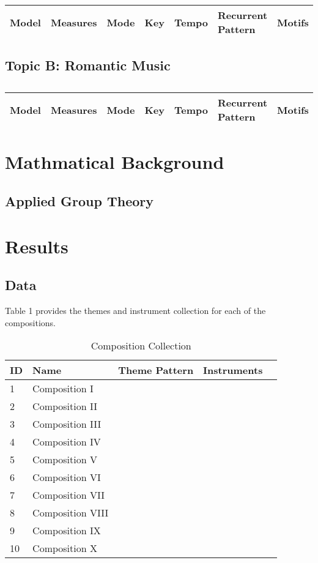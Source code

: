 \centering	
\begin{table}[H]\tiny
	\caption{}	
	\begin{tabular}{p{1cm}p{1cm}p{1cm}p{1cm}p{1cm}p{1cm}p{1cm}}
	\hline	
	Model & Measures & Mode & Key & Tempo & Recurrent Pattern & Motifs \\
	\hline 
	\hline 
	\end{tabular}
\end{table}

\subsection{Topic B: Romantic Music}


\centering	
\begin{table}[H]\tiny
	\caption{}	
	\begin{tabular}{p{1cm}p{1cm}p{1cm}p{1cm}p{1cm}p{1cm}p{1cm}}
		\hline	
		Model & Measures & Mode & Key & Tempo & Recurrent Pattern & Motifs \\
		\hline 
		\hline 
	\end{tabular}
\end{table}

\section{Mathmatical Background}


\subsection{Applied Group Theory}

\section{Results}

\subsection{Data}

Table 1 provides the themes and instrument collection for each of the compositions.
	
\begin{table}[H]
\caption{Composition Collection}	
\begin{tabular}{p{1cm}p{4cm}p{2cm}p{1cm}p{1cm}}
\hline
ID & Name & Theme Pattern & Instruments & \\
\hline 
1 & Composition I &  &  & \\
2 & Composition II &  &  & \\
3 & Composition III &  & \\
4 & Composition IV & & \\
5 & Composition V & & & \\
\hline 
6 & Composition VI &  &  & \\
7 & Composition VII &  &  & \\
8 & Composition VIII &  & \\
9 & Composition IX & & \\
10 & Composition X & & & \\
\end{tabular}
\end{table}

